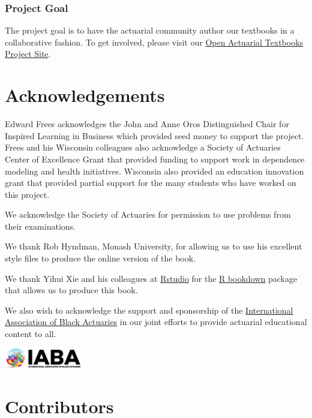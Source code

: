 \documentclass[
  12pt,
  krantz2]{Format/krantzNoCorner}
\begin{document}
\hypertarget{project-goal}{%
\subsubsection*{Project Goal}\label{project-goal}}


The project goal is to have the actuarial community author our textbooks in a collaborative fashion. To get involved, please visit our
\href{https://sites.google.com/a/wisc.edu/loss-data-analytics/}{Open Actuarial Textbooks Project Site}.

\hypertarget{acknowledgements}{%
\section*{Acknowledgements}\label{acknowledgements}}


Edward Frees acknowledges the John and Anne Oros Distinguished Chair for Inspired Learning in Business which provided seed money to support the project. Frees and his Wisconsin colleagues also acknowledge a Society of Actuaries Center of Excellence Grant that provided funding to support work in dependence modeling and health initiatives. Wisconsin also provided an education innovation grant that provided partial support for the many students who have worked on this project.

We acknowledge the Society of Actuaries for permission to use problems from their examinations.

We thank Rob Hyndman, Monash University, for allowing us to use his excellent style files to produce the online version of the book.

We thank Yihui Xie and his colleagues at \href{https://www.rstudio.com/}{Rstudio} for the \href{https://bookdown.org/yihui/bookdown/}{R bookdown} package that allows us to produce this book.

We also wish to acknowledge the support and sponsorship of the \href{http://www.blackactuaries.org/}{International Association of Black Actuaries} in our joint efforts to provide actuarial educational content to all.

\includegraphics[width=0.25\textwidth,height=\textheight]{Figures/IABA.png}

\hypertarget{contributors}{%
\section*{Contributors}\label{contributors}}
\end{document}
